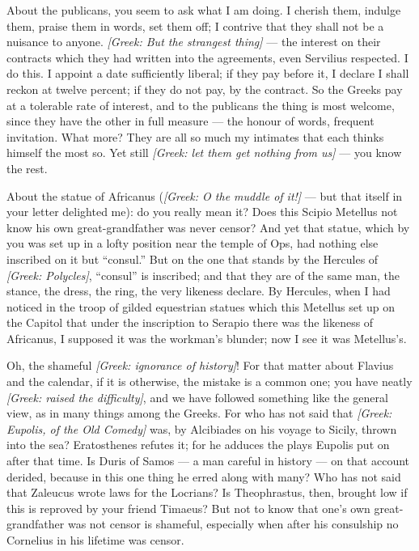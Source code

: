  About the publicans, you seem to ask what I am doing. I cherish them, indulge them, praise them in words, set them off; I contrive that they shall not be a nuisance to anyone. \textit{[Greek: But the strangest thing]} --- the interest on their contracts which they had written into the agreements, even Servilius respected. I do this. I appoint a date sufficiently liberal; if they pay before it, I declare I shall reckon at twelve percent; if they do not pay, by the contract. So the Greeks pay at a tolerable rate of interest, and to the publicans the thing is most welcome, since they have the other in full measure --- the honour of words, frequent invitation. What more? They are all so much my intimates that each thinks himself the most so. Yet still \textit{[Greek: let them get nothing from us]} --- you know the rest.

 About the statue of Africanus (\textit{[Greek: O the muddle of it!]} --- but that itself in your letter delighted me): do you really mean it? Does this Scipio Metellus not know his own great-grandfather was never censor? And yet that statue, which by you was set up in a lofty position near the temple of Ops, had nothing else inscribed on it but ``consul.'' But on the one that stands by the Hercules of \textit{[Greek: Polycles]}, ``consul'' is inscribed; and that they are of the same man, the stance, the dress, the ring, the very likeness declare. By Hercules, when I had noticed in the troop of gilded equestrian statues which this Metellus set up on the Capitol that under the inscription to Serapio there was the likeness of Africanus, I supposed it was the workman's blunder; now I see it was Metellus's.

 Oh, the shameful \textit{[Greek: ignorance of history]}! For that matter about Flavius and the calendar, if it is otherwise, the mistake is a common one; you have neatly \textit{[Greek: raised the difficulty]}, and we have followed something like the general view, as in many things among the Greeks. For who has not said that \textit{[Greek: Eupolis, of the Old Comedy]} was, by Alcibiades on his voyage to Sicily, thrown into the sea? Eratosthenes refutes it; for he adduces the plays Eupolis put on after that time. Is Duris of Samos --- a man careful in history --- on that account derided, because in this one thing he erred along with many? Who has not said that Zaleucus wrote laws for the Locrians? Is Theophrastus, then, brought low if this is reproved by your friend Timaeus? But not to know that one's own great-grandfather was not censor is shameful, especially when after his consulship no Cornelius in his lifetime was censor.

